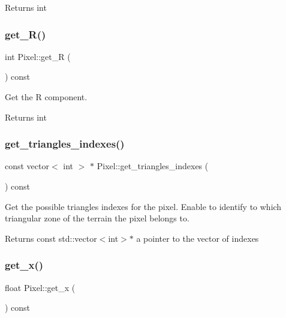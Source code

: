 \begin{DoxyReturn}{Returns}
int 
\end{DoxyReturn}
\mbox{\label{classPixel_ab2a26e47e90930b95012d56ca4dab3c0}} 
\subsubsection{\texorpdfstring{get\+\_\+\+R()}{get\_R()}}
{\footnotesize\ttfamily int Pixel\+::get\+\_\+R (\begin{DoxyParamCaption}{ }\end{DoxyParamCaption}) const}



Get the R component. 

\begin{DoxyReturn}{Returns}
int 
\end{DoxyReturn}
\mbox{\label{classPixel_a93366a506c032d97b25230469f0ca507}} 
\subsubsection{\texorpdfstring{get\+\_\+triangles\+\_\+indexes()}{get\_triangles\_indexes()}}
{\footnotesize\ttfamily const vector$<$ int $>$ $\ast$ Pixel\+::get\+\_\+triangles\+\_\+indexes (\begin{DoxyParamCaption}{ }\end{DoxyParamCaption}) const}



Get the possible triangles\textquotesingle{} indexes for the pixel. Enable to identify to which triangular zone of the terrain the pixel belongs to. 

\begin{DoxyReturn}{Returns}
const std\+::vector$<$int$>$$\ast$ a pointer to the vector of indexes 
\end{DoxyReturn}
\mbox{\label{classPixel_a07decaf3ba6ff526c8fa53fd730e9705}} 
\subsubsection{\texorpdfstring{get\+\_\+x()}{get\_x()}}
{\footnotesize\ttfamily float Pixel\+::get\+\_\+x (\begin{DoxyParamCaption}{ }\end{DoxyParamCaption}) const}



